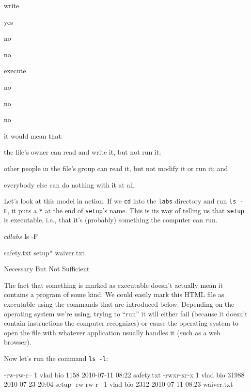 write

yes

no

no

execute

no

no

no

it would mean that:

\begin{swcitemize}
\item
  the file's owner can read and write it, but not run it;
\item
  other people in the file's group can read it, but not modify it or run
  it; and
\item
  everybody else can do nothing with it at all.
\end{swcitemize}

Let's look at this model in action. If we \texttt{cd} into the
\texttt{labs} directory and run \texttt{ls -F}, it puts a \texttt{*} at
the end of \texttt{setup}'s name. This is its way of telling us that
\texttt{setup} is executable, i.e., that it's (probably) something the
computer can run.

\begin{VerbIn}
$ cd labs
$ ls -F
\end{VerbIn}

\begin{VerbOut}
safety.txt    setup*     waiver.txt
\end{VerbOut}

\begin{swcbox}{Necessary But Not Sufficient}

The fact that something is marked as executable doesn't actually mean it
contains a program of some kind. We could easily mark this HTML file as
executable using the commands that are introduced below. Depending on
the operating system we're using, trying to ``run'' it will either fail
(because it doesn't contain instructions the computer recognizes) or
cause the operating system to open the file with whatever application
usually handles it (such as a web browser).

\end{swcbox}

Now let's run the command \texttt{ls -l}:


\begin{VerbOut}
-rw-rw-r-- 1 vlad bio  1158  2010-07-11 08:22 safety.txt
-rwxr-xr-x 1 vlad bio 31988  2010-07-23 20:04 setup
-rw-rw-r-- 1 vlad bio  2312  2010-07-11 08:23 waiver.txt
\end{VerbOut}

